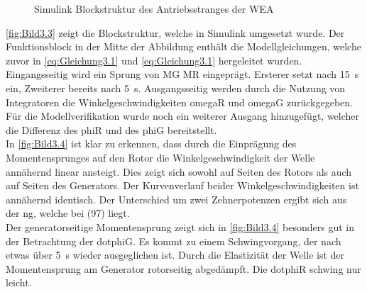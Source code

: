 \begin{figure}[H]
   \centering
   \caption[Antriebsstrang Simulink]{Simulink Blockstruktur des Antriebsstranges der WEA}
   \label{fig:Bild3.3}
\end{figure}

\autoref{fig:Bild3.3} zeigt die Blockstruktur, welche in Simulink umgesetzt wurde. Der Funktionsblock in der Mitte der Abbildung enthält die Modellgleichungen, welche zuvor in \autoref{eq:Gleichung3.1} und \autoref{eq:Gleichung3.1} hergeleitet wurden. Eingangsseitig wird ein Sprung von \acs{MG} \bzw \acs{MR} eingeprägt. Ersterer setzt nach \SI{15}{s} ein, Zweiterer bereits nach \SI{5}{s}. Ausgangsseitig werden durch die Nutzung von Integratoren die Winkelgeschwindigkeiten \acs{omegaR} und \acs{omegaG} zurückgegeben. Für die Modellverifikation wurde noch ein weiterer Ausgang hinzugefügt, welcher die Differenz des \ac{phiR} und des \ac{phiG} bereitstellt. \\

In \autoref{fig:Bild3.4} ist klar zu erkennen, dass durch die Einprägung des Momentensprunges auf den Rotor die Winkelgeschwindigkeit der Welle annähernd linear ansteigt. Dies zeigt sich sowohl auf Seiten des Rotors als auch auf Seiten des Generators. Der Kurvenverlauf beider Winkelgeschwindigkeiten ist annähernd identisch. Der Unterschied um zwei Zehnerpotenzen ergibt sich aus der \acf{ng}, welche bei  (97) liegt.\\
Der generatorseitige Momentensprung zeigt sich in \autoref{fig:Bild3.4} besonders gut in der Betrachtung der \ac{dotphiG}. Es kommt zu einem Schwingvorgang, der nach etwas über \SI{5}{s} wieder ausgeglichen ist. Durch die Elastizität der Welle ist der Momentensprung am Generator rotorseitig abgedämpft. Die \ac{dotphiR} schwing nur leicht.

